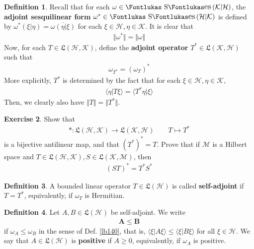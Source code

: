 \documentclass[12pt,b5paper,notitlepage]{article}
\theoremstyle{definition}
\newtheorem{df}{Definition}[subsection]
\newtheorem{exe}[df]{Exercise}
\theoremstyle{plain}
\DeclareMathOperator{\Ses}{\text{\Fontlukas S}\text{\kern -0pt {\Fontlukas\large es}}\,}
\newcommand{\fk}{\mathfrak}
\newcommand{\ovl}{\overline}
\newcommand{\bk}[1]{\langle {#1}\rangle}
\newcommand{\MH}{\mathcal H}
\newcommand{\MK}{\mathcal K}
\newcommand{\MM}{\mathcal M}
\numberwithin{equation}{section}
\begin{document}
\begin{df}
Recall that for each $\omega\in\Ses(\MK|\MH)$, the \textbf{adjoint sesquilinear form} $\omega^*\in\Ses(\MH|\MK)$ is defined by $\omega^*(\xi|\eta)=\ovl{\omega(\eta|\xi)}$ for each $\xi\in\MH,\eta\in\MK$. It is clear that
\begin{align*}
\Vert\omega^*\Vert=\Vert\omega\Vert
\end{align*}
Now, for each $T\in\fk L(\MH,\MK)$, define the \textbf{adjoint operator}  $T^*\in\fk L(\MK,\MH)$ such that
\begin{align*}
\omega_{T^*}=(\omega_T)^*
\end{align*}
More explicitly, $T^*$ is determined by the fact that for each $\xi\in\MH,\eta\in\MK$,
\begin{align*}
\bk{\eta|T\xi}=\bk{T^*\eta|\xi}
\end{align*}
Then, we clearly also have $\Vert T\Vert=\Vert T^*\Vert$.
\end{df}



\begin{exe}
Show that
\begin{align*}
*:\fk L(\MH,\MK)\rightarrow\fk L(\MK,\MH)\qquad T\mapsto T^*
\end{align*}
is a bijective antilinear map, and that $(T^*)^*=T$. Prove that if $\MM$ is a Hilbert space and $T\in\fk L(\MH,\MK),S\in\fk L(\MK,\MM)$, then
\begin{align*}
(ST)^*=T^*S^*
\end{align*}
\end{exe}


\begin{df}
A bounded linear operator $T\in\fk L(\MH)$ is called \textbf{self-adjoint}  if $T=T^*$, equivalently, if $\omega_T$ is Hermitian.
\end{df}


\begin{df}\label{lb247}
Let $A,B\in\fk L(\MH)$ be self-adjoint. We write
\begin{align*}
\pmb{A\leq B}
\end{align*}
if $\omega_A\leq\omega_B$ in the sense of Def. \ref{lb140}, that is, $\bk{\xi|A\xi}\leq\bk{\xi|B\xi}$ for all $\xi\in\MH$. We say that $A\in\fk L(\MH)$ is \textbf{positive}  if $A\geq0$, equivalently, if $\omega_A$ is positive. 
\end{df}
\end{document}
